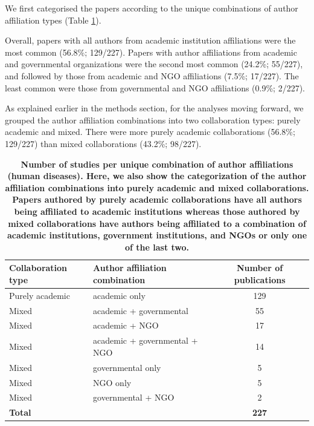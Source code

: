 \documentclass[10pt,letterpaper]{article}
\begin{document}
We first categorised the papers according to the unique combinations of author affiliation types (Table \ref{studies_per_author_affiliations_type}). 

Overall, papers with all authors from academic institution affiliations were the most common (56.8\%; 129/227). Papers with author affiliations from academic and governmental organizations were the second most common (24.2\%; 55/227), and followed by those from academic and NGO affiliations (7.5\%; 17/227). The least common were those from governmental and NGO affiliations (0.9\%; 2/227).

As explained earlier in the methods section, for the analyses moving forward, we grouped the author affiliation combinations into two collaboration types: purely academic and mixed. There were more purely academic collaborations (56.8\%; 129/227) than mixed collaborations (43.2\%; 98/227). 

\begin{table}[!h]
\centering
\caption{\bf Number of studies per unique combination of author affiliations (human diseases). Here, we also show the categorization of the author affiliation combinations into purely academic and mixed collaborations. Papers authored by purely academic collaborations have all authors being affiliated to academic institutions whereas those authored by mixed collaborations have authors being affiliated to a combination of academic institutions, government institutions, and NGOs or only one of the last two.}
\setlength\arrayrulewidth{1pt} 
\begin{tabular}{|l l c|}
\hline
\textbf{Collaboration type} & \textbf{Author affiliation combination} & \textbf{Number of publications} \\ \hline
Purely academic & academic only  & 129 \\ \hline
Mixed & academic + governmental   & 55 \\ \hline
Mixed & academic + NGO                 & 17  \\ \hline
Mixed & academic + governmental + NGO    & 14 \\ \hline
Mixed & governmental only                & 5 \\ \hline
Mixed & NGO only                       & 5  \\ \hline
Mixed & governmental + NGO               & 2 \\ \hline  \rowcolor{gray!20}
\textbf{Total} &  & \textbf{227} \\  \hline 
\end{tabular}
\label{studies_per_author_affiliations_type}
\end{table}
\end{document}
